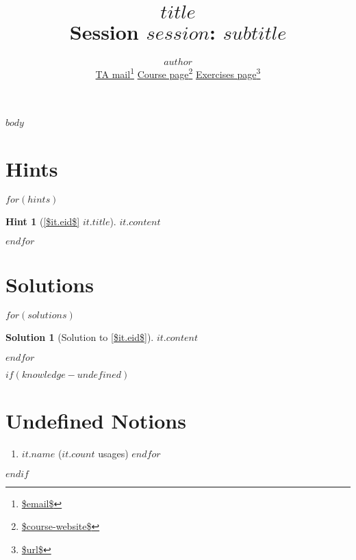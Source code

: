 \documentclass[a4,10pt]{article}
\title{{\bfseries \Huge{$title$}} \\ Session $session$: $subtitle$}
\author{$author$ \\
        \href{mailto:$email$}{TA mail}\footnote{\url{$email$}}
        \hspace{1em}
        \href{$course-website$}{Course page}\footnote{\url{$course-website$}}
        \hspace{1em}
        \href{$url$}{Exercises page}\footnote{\url{$url$}}
}
\newtheorem{hint}{Hint}
\newtheorem{solution}{Solution}
\begin{document}
\maketitle

$body$

\printbibliography


\clearpage
\appendix

\section{Hints}

$for(hints)$
\begin{hint}[{\cref{$it.eid$} $it.title$}]
    \label{$it.id$}
    $it.content$
\end{hint}
$endfor$

\clearpage
\section{Solutions}

$for(solutions)$
\begin{solution}[Solution to \cref{$it.eid$}]
    \label{$it.id$}
    $it.content$
\end{solution}
$endfor$

$if(knowledge-undefined)$
\clearpage
\section{Undefined Notions}
\begin{enumerate}
$for(knowledge-undefined)$
\item \texttt{$it.name$} ($it.count$ usages)
$endfor$
\end{enumerate}
$endif$
\end{document}

